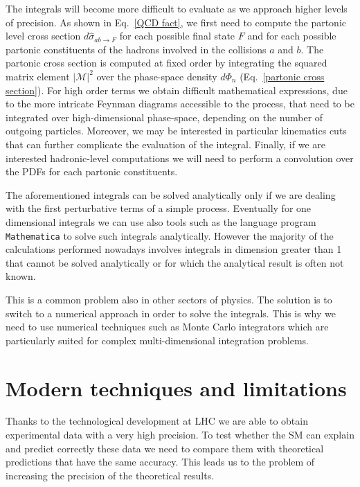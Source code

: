 \documentclass[../main/main.tex]{subfiles}
\begin{document}
The integrals will become more difficult to evaluate as we approach higher levels of precision. As shown in Eq.~\ref{QCD fact}, we first need to compute the partonic level cross section  $d\hat{\sigma}_{ab \rightarrow F}$ for each possible final state $F$ and for each possible partonic constituents of the hadrons involved in the collisions $a$ and $b$. The partonic cross section is computed at fixed order by integrating the squared matrix element $|\mathcal{M}|^2$ over the phase-space density $d\Phi_n$ (Eq.~\ref{partonic cross section}). For high order terms we obtain difficult mathematical expressions, due to the more intricate Feynman diagrams accessible to the process, that need to be integrated over high-dimensional phase-space, depending on the number of outgoing particles. Moreover, we may be interested in particular kinematics cuts that can further complicate the evaluation of the integral. Finally, if we are interested hadronic-level computations we will need to perform a convolution over the PDFs for each partonic constituents.

The aforementioned integrals can be solved analytically only if we are dealing with the first perturbative terms of a simple process. Eventually for one dimensional integrals we can use also tools such as the language program \texttt{Mathematica} \cite{Mathematica} to solve such integrals analytically. However the majority of the calculations performed nowadays involves integrals in dimension greater than 1 that cannot be solved analytically or for which the analytical result is often not known.

This is a common problem also in other sectors of physics. The solution is to switch to a numerical approach in order to solve the integrals. This is why we need to use numerical techniques such as Monte Carlo integrators which are particularly suited for complex multi-dimensional integration problems.  



\section{Modern techniques and limitations}

Thanks to the technological development at LHC we are able to obtain experimental data with a very high precision. To test whether 
the SM can explain and predict correctly these data we need to compare them with  theoretical predictions that have the same accuracy.
This leads us to the problem of increasing the precision of the theoretical results. 
\end{document}
